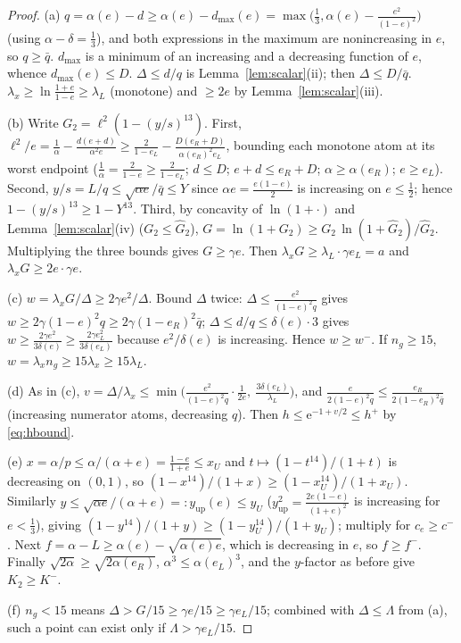 \documentclass[11pt]{amsart}
\newcommand{\eu}{\mathrm{e}}
\begin{document}
\begin{proof}
(a) $q=\alpha(e)-d\ge\alpha(e)-d_{\max}(e)
=\max\bigl(\tfrac13,\alpha(e)-\tfrac{e^2}{(1-e)^2}\bigr)$ (using
$\alpha-\delta=\tfrac13$), and both expressions in the maximum are
nonincreasing in $e$, so $q\ge\bar q$.  $d_{\max}$ is a minimum of an
increasing and a decreasing function of $e$, whence $d_{\max}(e)\le D$.
$\Delta\le d/q$ is Lemma~\ref{lem:scalar}(ii); then $\Delta\le D/\bar q$.
$\lambda_x\ge\ln\frac{1+e}{1-e}\ge\lambda_L$ (monotone) and $\ge2e$ by
Lemma~\ref{lem:scalar}(iii).

(b) Write $G_2=\ell^2(1-(y/s)^{13})$.  First,
$\ell^2/e=\frac1\alpha-\frac{d(e+d)}{\alpha^2e}
\ge\frac2{1-e_L}-\frac{D(e_R+D)}{\alpha(e_R)^2e_L}$,
bounding each monotone atom at its worst endpoint
($\tfrac1\alpha=\tfrac2{1-e}\ge\tfrac2{1-e_L}$; $d\le D$; $e+d\le e_R+D$;
$\alpha\ge\alpha(e_R)$; $e\ge e_L$).  Second,
$y/s=L/q\le\sqrt{\alpha e}/\bar q\le Y$ since
$\alpha e=\tfrac{e(1-e)}2$ is increasing on $e\le\tfrac12$; hence
$1-(y/s)^{13}\ge1-Y^{13}$.  Third, by concavity of $\ln(1+\cdot)$ and
Lemma~\ref{lem:scalar}(iv) ($G_2\le\widehat G_2$),
$G=\ln(1+G_2)\ge G_2\,\ln(1+\widehat G_2)/\widehat G_2$.  Multiplying the
three bounds gives $G\ge\gamma e$.  Then
$\lambda_xG\ge\lambda_L\cdot\gamma e_L=a$ and
$\lambda_xG\ge2e\cdot\gamma e$.

(c) $w=\lambda_xG/\Delta\ge2\gamma e^2/\Delta$.  Bound $\Delta$ twice:
$\Delta\le\frac{e^2}{(1-e)^2q}$ gives
$w\ge2\gamma(1-e)^2q\ge2\gamma(1-e_R)^2\bar q$;
$\Delta\le d/q\le\delta(e)\cdot3$ gives
$w\ge\frac{2\gamma e^2}{3\delta(e)}\ge\frac{2\gamma e_L^2}{3\delta(e_L)}$
because $e^2/\delta(e)$ is increasing.  Hence $w\ge w^-$.  If $n_g\ge15$,
$w=\lambda_xn_g\ge15\lambda_x\ge15\lambda_L$.

(d) As in (c), $v=\Delta/\lambda_x
\le\min\bigl(\frac{e^2}{(1-e)^2q}\cdot\frac1{2e},\
\frac{3\delta(e_L)}{\lambda_L}\bigr)$, and
$\frac{e}{2(1-e)^2q}\le\frac{e_R}{2(1-e_R)^2\bar q}$ (increasing numerator
atoms, decreasing $q$).  Then $h\le\eu^{-1+v/2}\le h^+$ by
\eqref{eq:hbound}.

(e) $x=\alpha/p\le\alpha/(\alpha+e)=\frac{1-e}{1+e}\le x_U$ and
$t\mapsto(1-t^{14})/(1+t)$ is decreasing on $(0,1)$, so
$(1-x^{14})/(1+x)\ge(1-x_U^{14})/(1+x_U)$.  Similarly
$y\le\sqrt{\alpha e}/(\alpha+e)=:y_{\mathrm{up}}(e)\le y_U$
($y_{\mathrm{up}}^2=\frac{2e(1-e)}{(1+e)^2}$ is increasing for
$e<\tfrac13$), giving $(1-y^{14})/(1+y)\ge(1-y_U^{14})/(1+y_U)$; multiply
for $c_e\ge c^-$.  Next $f=\alpha-L\ge\alpha(e)-\sqrt{\alpha(e)e}$, which is
decreasing in $e$, so $f\ge f^-$.  Finally
$\sqrt{2\alpha}\ge\sqrt{2\alpha(e_R)}$, $\alpha^3\le\alpha(e_L)^3$, and the
$y$-factor as before give $K_2\ge K^-$.

(f) $n_g<15$ means $\Delta>G/15\ge\gamma e/15\ge\gamma e_L/15$; combined
with $\Delta\le\Lambda$ from (a), such a point can exist only if
$\Lambda>\gamma e_L/15$.
\end{proof}
\end{document}
